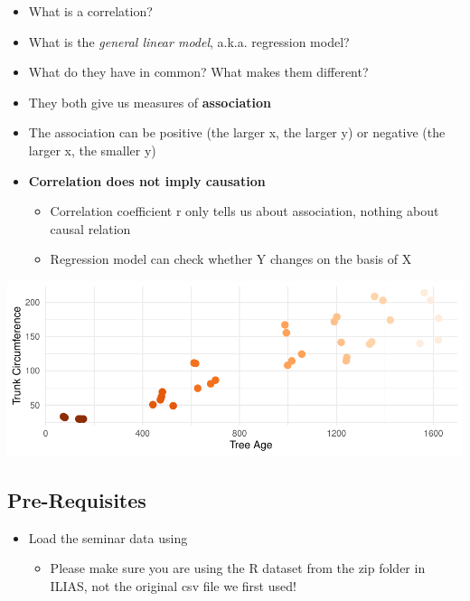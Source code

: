 \documentclass[
]{book}
\providecommand{\tightlist}{%
  \setlength{\itemsep}{0pt}\setlength{\parskip}{0pt}}
\begin{document}
\begin{itemize}
\item
  What is a correlation?
\item
  What is the \emph{general linear model}, a.k.a. regression model?
\item
  What do they have in common? What makes them different?
\item
  They both give us measures of \textbf{association}
\item
  The association can be positive (the larger x, the larger y) or negative (the larger x, the smaller y)
\item
  \textbf{Correlation does not imply causation}

  \begin{itemize}
  \tightlist
  \item
    Correlation coefficient r only tells us about association, nothing about causal relation
  \item
    Regression model can check whether Y changes on the basis of X
  \end{itemize}
\end{itemize}

\includegraphics{_main_files/figure-latex/unnamed-chunk-67-1.pdf}

\subsection{Pre-Requisites}\label{pre-requisites-1}

\begin{itemize}
\tightlist
\item
  Load the seminar data using

  \begin{itemize}
  \tightlist
  \item
    Please make sure you are using the R dataset from the
    zip folder in ILIAS, not the original csv file we first used!
  \end{itemize}
\end{itemize}
\end{document}

